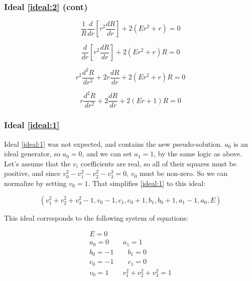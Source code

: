 \documentclass{beamer}
\begin{document}
\begin{frame}
\frametitle{Ideal \eqref{ideal:2} (cont)}

\begin{equation*}
\frac{1}{R} \frac{d}{dr}\left[ r^2 \frac{dR}{dr}\right] + 2(Er^2 + r) = 0
\end{equation*}

\begin{equation*}
\frac{d}{dr}\left[ r^2 \frac{dR}{dr}\right] + 2(Er^2 + r) R = 0
\end{equation*}

\begin{equation*}
r^2 \frac{d^2R}{dr^2} + 2r \frac{dR}{dr} + 2(Er^2 + r) R = 0
\end{equation*}

\begin{equation*}
r \frac{d^2R}{dr^2} + 2 \frac{dR}{dr} + 2(Er + 1) R = 0
\end{equation*}


\end{frame}

\begin{frame}
\frametitle{Ideal \eqref{ideal:1}}
Ideal \eqref{ideal:1} was not expected, and contains the new pseudo-solution.
$a_0$ is an ideal generator,
so $a_0=0$, and we can set $a_1=1$, by the same logic as above.
Let's assume that the $v_i$ coefficients are real, so all of their squares must
be positive, and since $v_0^2-v_1^2-v_2^2-v_3^3=0$, $v_0$ must be non-zero.  So we can normalize by setting $v_0=1$.
That simplifies \eqref{ideal:1} to this ideal:

\begin{equation}
\left(v_{1}^{2} + v_{2}^{2} + v_{3}^{2} - 1, v_{0} - 1, c_{1}, c_{0} + 1, b_{1}, b_{0} + 1, a_{1} - 1, a_{0}, E\right)
\end{equation}

This ideal corresponds to the following system of equations:

\begin{equation}
\begin{gathered}
E = 0 \\
a_0 = 0 \qquad
a_1 = 1 \\
b_0 = -1 \qquad
b_1 = 0 \\
c_0 = -1 \qquad
c_1 = 0 \\
v_0 = 1 \qquad
v_1^2 + v_2^2 + v_3^2 = 1
\end{gathered}
\end{equation}

\end{frame}
\end{document}
